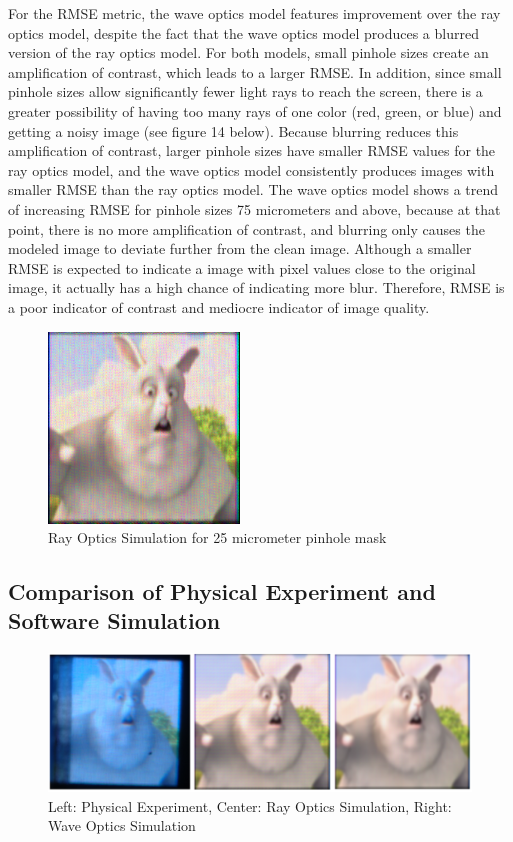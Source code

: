 For the RMSE metric, the wave optics model features improvement over the ray optics model, despite the fact that the wave optics model produces a blurred version of the ray optics model. For both models, small pinhole sizes create an amplification of contrast, which leads to a larger RMSE. In addition, since small pinhole sizes allow significantly fewer light rays to reach the screen, there is a greater possibility of having too many rays of one color (red, green, or blue) and getting a noisy image (see figure 14 below). Because blurring reduces this amplification of contrast, larger pinhole sizes have smaller RMSE values for the ray optics model, and the wave optics model consistently produces images with smaller RMSE than the ray optics model. The wave optics model shows a trend of increasing RMSE for pinhole sizes 75 micrometers and above, because at that point, there is no more amplification of contrast, and blurring only causes the modeled image to deviate further from the clean image. Although a smaller RMSE is expected to indicate a image with pixel values close to the original image, it actually has a high chance of indicating more blur. Therefore, RMSE is a poor indicator of contrast and mediocre indicator of image quality. 

\begin{figure}[ht]
  \centering
  \includegraphics[width=2in]{chapters/chapter8/images/simulationResult_25.png}
  \caption{Ray Optics Simulation for 25 micrometer pinhole mask}
  \label{fig:ferrari}
\end{figure}

\subsection{Comparison of Physical Experiment and Software Simulation}

\begin{figure}[ht]
  \centering
  \includegraphics[width=6in]{chapters/chapter8/images/Comparison.png}
  \caption{Left: Physical Experiment, Center: Ray Optics Simulation, Right: Wave Optics Simulation}
  \label{fig:ferrari}
\end{figure}

